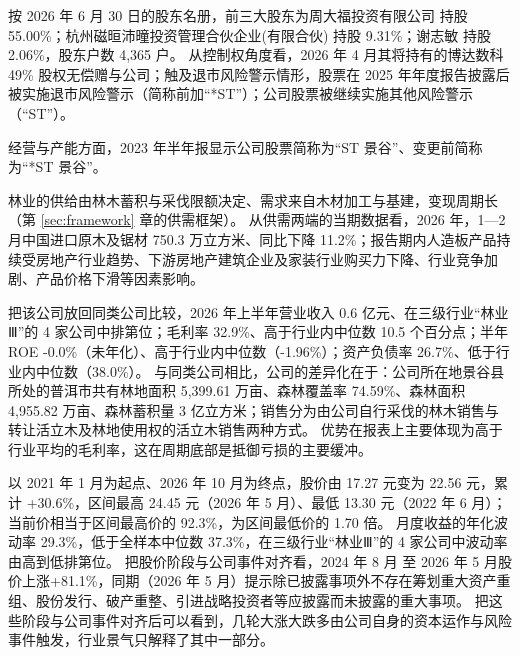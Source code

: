  按 2026 年 6 月 30 日的股东名册，前三大股东为周大福投资有限公司 持股 55.00\%；杭州磁晅沛曈投资管理合伙企业(有限合伙) 持股 9.31\%；谢志敏 持股 2.06\%，股东户数 4,365 户。 从控制权角度看，2026 年 4 月其将持有的博达数科 49\% 股权无偿赠与公司；触及退市风险警示情形，股票在 2025 年年度报告披露后被实施退市风险警示（简称前加“*ST”）；公司股票被继续实施其他风险警示（“ST”）。

 经营与产能方面，2023 年半年报显示公司股票简称为“ST 景谷”、变更前简称为“*ST 景谷”。

 林业的供给由林木蓄积与采伐限额决定、需求来自木材加工与基建，变现周期长（第 \ref{sec:framework} 章的供需框架）。 从供需两端的当期数据看，2026 年，1—2 月中国进口原木及锯材 750.3 万立方米、同比下降 11.2\%；报告期内人造板产品持续受房地产行业趋势、下游房地产建筑企业及家装行业购买力下降、行业竞争加剧、产品价格下滑等因素影响。

 把该公司放回同类公司比较，2026 年上半年营业收入 0.6 亿元、在三级行业“林业Ⅲ”的 4 家公司中排第位；毛利率 32.9\%、高于行业内中位数 10.5 个百分点；半年 ROE -0.0\%（未年化）、高于行业内中位数（-1.96\%）；资产负债率 26.7\%、低于行业内中位数（38.0\%）。 与同类公司相比，公司的差异化在于：公司所在地景谷县所处的普洱市共有林地面积 5,399.61 万亩、森林覆盖率 74.59\%、森林面积 4,955.82 万亩、森林蓄积量 3 亿立方米；销售分为由公司自行采伐的林木销售与转让活立木及林地使用权的活立木销售两种方式。 优势在报表上主要体现为高于行业平均的毛利率，这在周期底部是抵御亏损的主要缓冲。

 以 2021 年 1 月为起点、2026 年 10 月为终点，股价由 17.27 元变为 22.56 元，累计 +30.6\%，区间最高 24.45 元（2026 年 5 月）、最低 13.30 元（2022 年 6 月）；当前价相当于区间最高价的 92.3\%，为区间最低价的 1.70 倍。 月度收益的年化波动率 29.3\%，低于全样本中位数 37.3\%，在三级行业“林业Ⅲ”的 4 家公司中波动率由高到低排第位。 把股价阶段与公司事件对齐看，2024 年 8 月 至 2026 年 5 月股价上涨+81.1\%，同期（2026 年 5 月）提示除已披露事项外不存在筹划重大资产重组、股份发行、破产重整、引进战略投资者等应披露而未披露的重大事项。 把这些阶段与公司事件对齐后可以看到，几轮大涨大跌多由公司自身的资本运作与风险事件触发，行业景气只解释了其中一部分。

